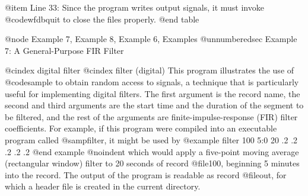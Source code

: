 {{{{{{{{{{@item Line 33:
Since the program writes output signals, it must invoke @code{wfdbquit} to
close the files properly.
@end table

@node     Example 7, Example 8, Example 6, Examples
@unnumberedsec Example 7:  A General-Purpose FIR Filter

@cindex digital filter
@cindex filter (digital)
This program illustrates the use of @code{sample} to obtain random
access to signals, a technique that is particularly
useful for implementing digital filters.  The first argument is the
record name, the second and third arguments are the start time and the
duration of the segment to be filtered, and the rest of the arguments
are finite-impulse-response (FIR) filter coefficients.  For example, if
this program were compiled into an executable program called
@samp{filter}, it might be used by
@example
filter 100 5:0 20 .2 .2 .2 .2 .2
@end example
@noindent
which would apply a five-point moving average (rectangular window) filter
to 20 seconds of record @file{100}, beginning 5 minutes into the record.
The output of the program is readable as record @file{out}, for which a
header file is created in the current directory.

}}}}}}}}}}
